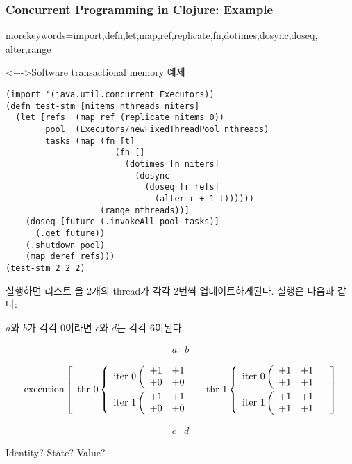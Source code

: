 \begin{frame}[fragile,allowframebreaks=1]
\frametitle{Concurrent Programming in Clojure: Example}
    {morekeywords={import,defn,let,map,ref,replicate,fn,dotimes,dosync,doseq,
                   alter,range}
    }
\begin{block}<+->{Software transactional memory 예제}
\begin{lstlisting}
(import '(java.util.concurrent Executors))
(defn test-stm [nitems nthreads niters]
  (let [refs  (map ref (replicate nitems 0))
        pool  (Executors/newFixedThreadPool nthreads)
        tasks (map (fn [t]
                      (fn []
                        (dotimes [n niters]
                          (dosync
                            (doseq [r refs]
                              (alter r + 1 t))))))
                   (range nthreads))]
    (doseq [future (.invokeAll pool tasks)]
      (.get future))
    (.shutdown pool)
    (map deref refs)))
(test-stm 2 2 2)
\end{lstlisting}
\end{block}

\pagebreak

실행하면 리스트 을 2개의 
thread가 각각 2번씩 업데이트하게된다. 실행은 다음과 같다:

$a$와 $b$가 각각 $0$이라면 $c$와 $d$는 각각 $6$이된다.

\[
\begin{array}{ll}
a & b
\end{array}
\]

\[
\textrm{execution}\left[
\begin{array}{ll}
  \textrm{thr 0}\left\{
  \begin{array}{l}
    \textrm{iter 0}\left(
    \begin{array}{ll}
    +1 & +1 \\
    +0 & +0 
    \end{array}
    \right.\\[2ex]
    \textrm{iter 1}\left(
    \begin{array}{ll}
    +1 & +1 \\
    +0 & +0 
    \end{array}
    \right.
  \end{array}
  \right.
& 
  \textrm{thr 1}\left\{
  \begin{array}{l}
    \textrm{iter 0}\left(
    \begin{array}{ll}
    +1 & +1 \\
    +1 & +1 
    \end{array}
    \right.\\[2ex]
    \textrm{iter 1}\left(
    \begin{array}{ll}
    +1 & +1 \\
    +1 & +1 
    \end{array}
    \right.
  \end{array}
  \right.
\end{array}
\right]
\]

\[
\begin{array}{ll}
c & d
\end{array}
\]

Identity? State? Value?

\end{frame}
